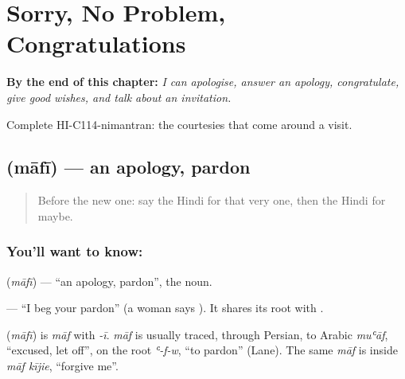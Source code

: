 
\chapter{Sorry, No Problem, Congratulations}
\label{ch:hi-sorry-no-problem}

\begin{chapteropening}
\textbf{By the end of this chapter:} \emph{I can apologise, answer an apology, congratulate, give good wishes, and talk about an invitation.}

Complete HI-C114-nimantran: the courtesies that come around a visit.
\end{chapteropening}

\section[\texorpdfstring{\hi{माफ़ी} (māfī)}{माफ़ी (māfī)}]{ (māfī) — an apology, pardon}

\label{lesson:HI-C114-mafi}



\begin{quote}
Before the new one: say the Hindi for that very one, then the Hindi for maybe.
\end{quote}

\subsection*{You'll want to know: }
\textbf{} (\emph{māfī}) — \textquotedblleft{}an apology, pardon\textquotedblright{}, the noun.

\textbf{  } — \textquotedblleft{}I beg your pardon\textquotedblright{} (a woman says \textbf{}). It shares its root with \textbf{ }.

\begin{cousinweb}
\textbf{} (\emph{māfī}) is \emph{māf} with \emph{-ī}. \emph{māf} is usually traced, through Persian, to Arabic \emph{muʿāf}, \textquotedblleft{}excused, let off\textquotedblright{}, on the root \emph{ʿ-f-w}, \textquotedblleft{}to pardon\textquotedblright{} (Lane). The same \emph{māf} is inside \emph{māf kījie}, \textquotedblleft{}forgive me\textquotedblright{}.
\end{cousinweb}

